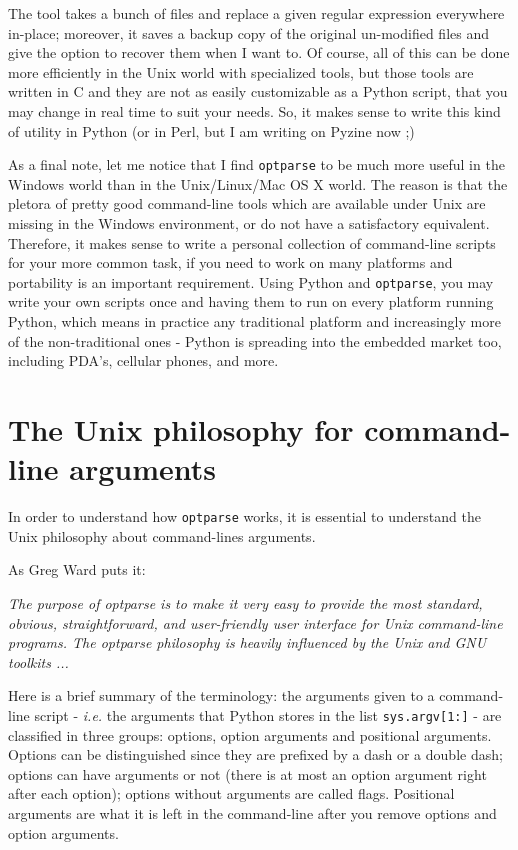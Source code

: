 \documentclass[10pt,a4paper,english]{article}
\begin{document}
The tool takes a bunch of files and replace a given regular expression 
everywhere in-place; moreover, it saves a backup copy of the original 
un-modified files and give the option to recover 
them when I want to.  Of course, all of this can be done more efficiently 
in the Unix world with specialized tools, but those tools are written 
in C and they are not as easily customizable as a Python script, that 
you may change in real time to suit your needs. So, it makes sense 
to write this kind of utility in Python (or in Perl, but I am writing on 
Pyzine now ;)

As a final note, let me notice that I find \texttt{optparse} 
to be much more useful in the Windows world than in the Unix/Linux/Mac OS X
world. The reason is that the pletora 
of pretty good command-line tools which are available under Unix are 
missing in the Windows environment, or do not have a satisfactory 
equivalent. Therefore, 
it makes sense to write a personal collection of command-line scripts 
for your more common task, if you need to work on many platforms and
portability is an important requirement. 
Using Python and \texttt{optparse}, you may write your own scripts 
once and having them to run on every platform running Python, 
which means in practice any traditional platform and increasingly
more of the non-traditional ones - Python is spreading into the 
embedded market too, including PDA's, cellular phones, and more.



\hypertarget{the-unix-philosophy-for-command-line-arguments}{}
\section*{The Unix philosophy for command-line arguments}

In order to understand how \texttt{optparse} works, it is essential
to understand the Unix philosophy about command-lines arguments.

As Greg Ward puts it:

\emph{The purpose of optparse is to make it very easy to provide the 
most standard, obvious, straightforward, and user-friendly user 
interface for Unix command-line programs. The optparse philosophy 
is heavily influenced by the Unix and GNU toolkits ...}

Here is a brief summary of the terminology:
the arguments given to a command-line script - \emph{i.e.}  the arguments
that Python stores in the list \texttt{sys.argv{[}1:]} - are classified in
three groups: options, option arguments and positional arguments. 
Options can be distinguished since they are prefixed by a dash
or a double dash; options can have arguments or not 
(there is at most an option argument right after each option); 
options without arguments are called flags. Positional arguments 
are what it is left in the command-line after you remove options 
and option arguments.
\end{document}
